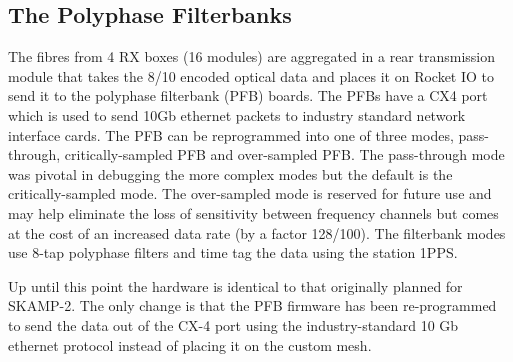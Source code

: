 \subsection{The Polyphase Filterbanks}
The fibres from 4 RX boxes (16 modules) are aggregated in a rear transmission module that takes the 8/10 encoded optical data and places it on Rocket IO to send it to the polyphase filterbank (PFB) boards. The PFBs have a CX4 port which is used to send 10Gb ethernet packets to industry standard network interface cards. The PFB can be reprogrammed into one of three modes, pass-through, critically-sampled PFB and over-sampled PFB. The pass-through mode was pivotal in debugging the more complex modes but the default is the critically-sampled mode. The over-sampled mode is reserved for future use and may help eliminate the loss of sensitivity between frequency channels but comes at the cost of an increased data rate (by a factor 128/100). The filterbank modes use 8-tap polyphase filters and time tag the data using the station 1PPS.

Up until this point the hardware is identical to that originally planned for SKAMP-2. The only change is that the PFB firmware has been re-programmed to send the data out of the CX-4 port using the industry-standard 10 Gb ethernet protocol instead of placing it on the custom mesh.

